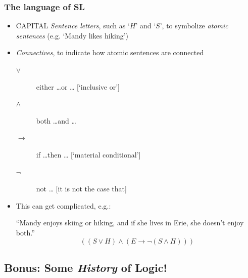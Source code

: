 \begin{frame}
  \frametitle{The language of SL}

  \begin{itemize}[<+->]
  \item CAPITAL \emph{Sentence letters}, such as `$H$' and `$S$', to symbolize \textit{atomic sentences} (e.g. `Mandy likes hiking')
  \item \emph{Connectives}, to indicate how atomic sentences are connected
  \begin{description}
    \item[$\lor$] either \dots or \dots \hspace{4em} [`inclusive or']
    \item[$\land$] both \dots and \dots
    \item[$\to$] if \dots then \dots \hspace{4.2em} [`material conditional']
    \item[$\lnot$] not \dots \hspace{6em} [it is not the case that]
  \end{description}

  \item[] This can get complicated, e.g.:

  ``Mandy enjoys skiing or hiking, and if she lives in Erie, she
  doesn't enjoy both.''
  \[
  ((S \lor H) \land (E \to \lnot(S \land H)))
  \]
  \end{itemize}
\end{frame}

\subsection{Bonus: Some \emph{History} of Logic!}

